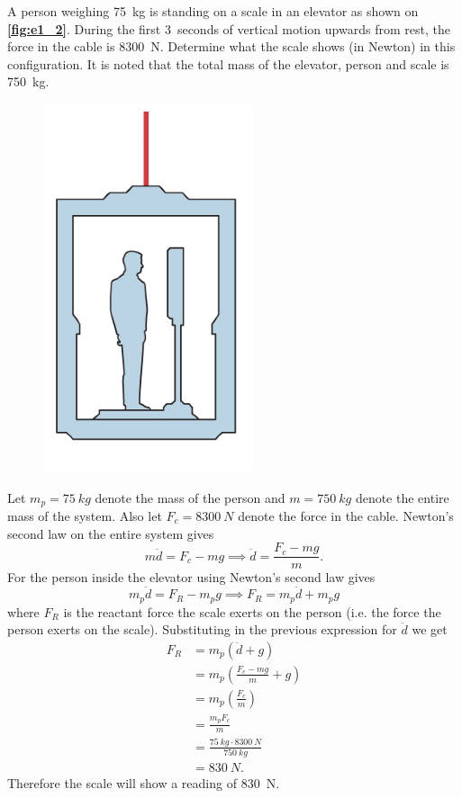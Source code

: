 A person weighing \qty{75}{kg} is standing on a scale in an elevator as shown on \textbf{\autoref{fig:e1_2}}. During the first \qty{3}{seconds} of vertical motion upwards from rest, the force in the cable is \qty{8300}{N}. Determine what the scale shows (in \unit{Newton}) in this configuration. It is noted that the total mass of the elevator, person and scale is \qty{750}{kg}.

\begin{figure} [ht]
  \centering
  \includegraphics[width=0.25\linewidth]{./figures/e1_2.png}
  \caption{}
  \label{fig:e1_2}
\end{figure}

\bigbreak
Let $m_p = \qty{75}{kg}$ denote the mass of the person and $m = \qty{750}{kg}$ denote the entire mass of the system. Also let $F_c = \qty{8300}{N}$ denote the force in the cable. Newton's second law on the entire system gives
\[ 
m \ddot{d} = F_c - mg \implies \ddot{d} = \frac{F_c - mg}{m}
.\]
For the person inside the elevator using Newton's second law gives
\[ 
  m_p \ddot{d} = F_R - m_p g \implies F_R = m_p \ddot{d} + m_p g
\]
where $F_R$ is the reactant force the scale exerts on the person (i.e. the force the person exerts on the scale). Substituting in the previous expression for $\ddot{d}$ we get
\begin{align*}
  F_R &= m_p \left( \ddot{d} + g \right) \\
  &= m_p \left( \frac{F_c - mg}{m} + g \right) \\
  &= m_p \left( \frac{F_c}{m} \right) \\
  &= \frac{m_p F_c}{m} \\
  &= \frac{\qty{75}{kg} \cdot \qty{8300}{N}}{\qty{750}{kg}} \\
  &= \qty{830}{N} 
.\end{align*}
Therefore the scale will show a reading of \qty{830}{N}.
